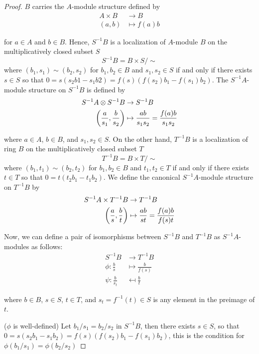 \begin{proof}
	$B$ carries the $A$-module structure defined by
	\begin{align*}
		A \times B &\to B \\
		(a, b) &\mapsto f(a)b
	\end{align*}
	
	for $a \in A$ and $b \in B$. Hence, $S^{-1} B$ is a localization of $A$-module $B$ on the multiplicatively closed subset $S$
	$$
		S^{-1} B = B \times S / \sim
	$$
	where $(b_1, s_1) \sim (b_2, s_2)$ for $b_1, b_2 \in B$ and $s_1, s_2 \in S$ if and only if there exists $s \in S$ so that $0 = s(s_2 b1 - s_1 b2) = f(s) (f(s_2) b_1 - f(s_1) b_2)$. The $S^{-1}A$-module structure on $S^{-1} B$ is defined by
	\begin{align*}
		S^{-1} A \otimes S^{-1} B &\to S^{-1} B \\
		\tuple*{\frac{a}{s_1}, \frac{b}{s_2}} &\mapsto \frac{ab}{s_1 s_2} = \frac{f(a) b}{s_1 s_2}
	\end{align*}

	where $a \in A$, $b \in B$, and $s_1, s_2 \in S$. On the other hand, $T^{-1} B$ is a localization of ring $B$ on the multiplicatively closed subset $T$
	$$
		T^{-1} B = B \times T / \sim
	$$
	where $(b_1, t_1) \sim (b_2, t_2)$ for $b_1, b_2 \in B$ and $t_1, t_2 \in T$ if and only if there exists $t \in T$ so that $0 = t(t_2 b_1 - t_1 b_2)$. We define the canonical $S^{-1} A$-module structure on $T^{-1} B$ by
	\begin{align*}
		S^{-1} A \times T^{-1} B &\to T^{-1} B\\
		\tuple*{\frac{a}{s}, \frac{b}{t}} &\mapsto \frac{ab}{st} = \frac{f(a) b}{f(s) t}
	\end{align*}

	Now, we can define a pair of isomorphisms between $S^{-1} B$ and $T^{-1} B$ as $S^{-1}A$-modules as follows:
	\begin{align*}
		S^{-1} B &\to T^{-1} B \\
		\phi: \frac{b}{s} &\mapsto \frac{b}{f(s)} \\
		\psi: \frac{b}{s_t} &\mapsfrom \frac{b}{t}
	\end{align*}

	where $b \in B$, $s \in S$, $t \in T$, and $s_t = f^{-1}(t) \in S$ is any element in the preimage of $t$.

	($\phi$ is well-defined) Let $b_1 / s_1 = b_2 / s_2$ in $S^{-1}B$, then there exists $s \in S$, so that $0 = s(s_2 b_1 - s_1 b_2) = f(s) (f(s_2) b_1 - f(s_1) b_2)$, this is the condition for $\phi(b_1 / s_1) = \phi(b_2 / s_2)$


\end{proof}
